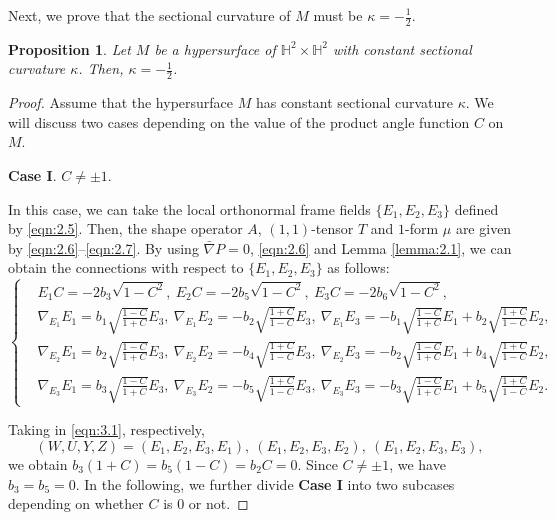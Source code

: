 \documentclass[reqno]{amsart}%
\newtheorem{proposition}[theorem]{Proposition}
\theoremstyle{definition}
\newtheorem{remark}{Remark}[section]
\numberwithin{equation}{section}
\begin{document}


Next, we prove that the sectional curvature of $M$ must be
$\kappa=-\tfrac{1}{2}$.
\begin{proposition}\label{prop:4.5}
Let $M$ be a hypersurface of $\mathbb{H}^2\times\mathbb{H}^2$ with constant sectional curvature $\kappa$.
Then, $\kappa=-\tfrac{1}{2}$.
\end{proposition}
%
\begin{proof}
Assume that the hypersurface $M$ has constant sectional curvature $\kappa$.
We will discuss two cases depending on the value of
the product angle function $C$ on $M$.

{\bf Case I}. $C\neq\pm1$.

In this case, we can take the local orthonormal frame fields $\{E_1,E_2,E_3\}$
defined by \eqref{eqn:2.5}.
Then, the shape operator $A$, $(1,1)$-tensor $T$ and $1$-form $\mu$
are given by \eqref{eqn:2.6}--\eqref{eqn:2.7}.
By using $\bar{\nabla}P=0$, \eqref{eqn:2.6} and Lemma \ref{lemma:2.1},
we can obtain the connections with respect to $\{E_1,E_2,E_3\}$ as follows:
%
\begin{equation}\label{eqn:LL}
\left\{
\begin{aligned}
&E_1C=-2b_3\sqrt{1-C^2},\ E_2C=-2b_5\sqrt{1-C^2},\ E_3C=-2b_6\sqrt{1-C^2},\\ 		
&\nabla_{E_1}E_1=b_1\sqrt{\tfrac{1-C}{1+C}}E_3,\
\nabla_{E_1}E_2=-b_2\sqrt{\tfrac{1+C}{1-C}}E_3,\ \nabla_{E_1}E_3=-b_1\sqrt{\tfrac{1-C}{1+C}}E_1
+b_2\sqrt{\tfrac{1+C}{1-C}}E_2,\\
&\nabla_{E_2} E_1=b_2\sqrt{\tfrac{1-C}{1+C}}E_3,\
\nabla_{E_2} E_2=-b_4\sqrt{\tfrac{1+C}{1-C}}E_3,\ \nabla_{E_2}E_3=-b_2\sqrt{\tfrac{1-C}{1+C}}E_1
+b_4\sqrt{\tfrac{1+C}{1-C}}E_2,\\
&\nabla_{E_3}E_1=b_3\sqrt{\tfrac{1-C}{1+C}}E_3,\
\nabla_{E_3}E_2=-b_5\sqrt{\tfrac{1+C}{1-C}}E_3,\ \nabla_{E_3}E_3=-b_3\sqrt{\tfrac{1-C}{1+C}}E_1
+b_5\sqrt{\tfrac{1+C}{1-C}}E_2.
\end{aligned}\right.
\end{equation}


Taking in \eqref{eqn:3.1}, respectively, %
%
$$
(W,U,Y,Z)=(E_1,E_2,E_3,E_1), \ (E_1,E_2,E_3,E_2), \ (E_1,E_2,E_3,E_3),
$$
we obtain $b_3(1+C)=b_5(1-C)=b_2C=0$.
Since $C\neq\pm1$, we have $b_3=b_5=0$. In the following, we further divide {\bf Case I} into two subcases depending on whether $C$ is $0$ or not.


\end{proof}
\end{document}
